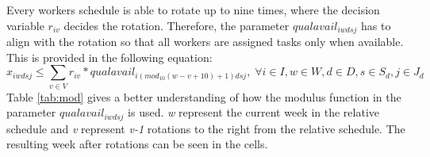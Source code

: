 Every workers schedule is able to rotate up to nine times, where the decision variable $r_{iv}$ decides the rotation. Therefore, the parameter $qualavail_{iwdsj}$ has to align with the rotation so that all workers are assigned tasks only when available. This is provided in the following equation:
\begin{equation} \label{constr:qualavail}
x_{iwdsj} \leq \sum_{v \in V} r_{iv}*qualavail_{i(mod_{10}(w-v+10)+1)dsj}, \; \forall i \in I, w \in W, d \in D, s \in S_d, j \in J_d
\end{equation}
Table \ref{tab:mod} gives a better understanding of how the modulus function in the parameter $qualavail_{iwdsj}$ is used. \textit{w} represent the current week in the relative schedule and \textit{v} represent \textit{v-1} rotations to the right from the relative schedule. The resulting week after rotations can be seen in the cells.
